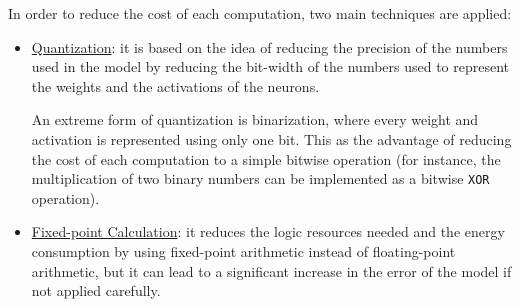 In order to reduce the cost of each computation, two main techniques are applied:
\begin{itemize}
    \item \ul{Quantization}: it is based on the idea of reducing the precision of the numbers used in the model by reducing the bit-width of the numbers used to represent the weights and the activations of the neurons.
    
    An extreme form of quantization is binarization, where every weight and activation is represented using only one bit. This as the advantage of reducing the cost of each computation to a simple bitwise operation (for instance, the multiplication of two binary numbers can be implemented as a bitwise \verb|XOR| operation).
    \item \ul{Fixed-point Calculation}: it reduces the logic resources needed and the energy consumption by using fixed-point arithmetic instead of floating-point arithmetic, but it can lead to a significant increase in the error of the model if not applied carefully.
\end{itemize}